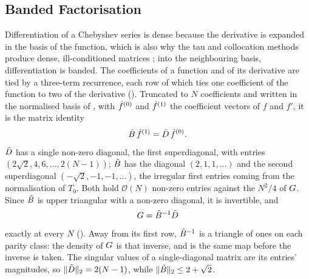 \subsection{Banded Factorisation}
\label{sec:descriptor-construction}

Differentiation of a Chebyshev series is dense because the derivative is expanded in the basis of the function, which is also why the tau and collocation methods produce dense, ill-conditioned matrices \cite{olver2013,boyd2001Chebyshev}; into the neighbouring basis, differentiation is banded. The coefficients of a function and of its derivative are tied by a three-term recurrence, each row of which ties one coefficient of the function to two of the derivative (). Truncated to $N$ coefficients and written in the normalised basis of , with $\hat{f}^{(0)}$ and $\hat{f}^{(1)}$ the coefficient vectors of $f$ and $f'$, it is the matrix identity
\begin{equation}
    \tilde{B}\,\hat{f}^{(1)} = \tilde{D}\,\hat{f}^{(0)} .
    \label{eq:banded-factorisation}
\end{equation}
$\tilde{D}$ has a single non-zero diagonal, the first superdiagonal, with entries $(2\sqrt2,4,6,\dots,2(N-1))$; $\tilde{B}$ has the diagonal $(2,1,1,\dots)$ and the second superdiagonal $(-\sqrt2,-1,-1,\dots)$, the irregular first entries coming from the normalisation of $T_0$. Both hold $\mathcal{O}(N)$ non-zero entries against the $N^2/4$ of $G$. Since $\tilde{B}$ is upper triangular with a non-zero diagonal, it is invertible, and
\begin{equation}
    G = \tilde{B}^{-1}\tilde{D}
    \label{eq:G-banded}
\end{equation}
exactly at every $N$ (). Away from its first row, $\tilde{B}^{-1}$ is a triangle of ones on each parity class: the density of $G$ is that inverse, and  is the same map before the inverse is taken. The singular values of a single-diagonal matrix are its entries' magnitudes, so $\|\tilde{D}\|_2=2(N-1)$, while $\|\tilde{B}\|_2\le2+\sqrt2$.

